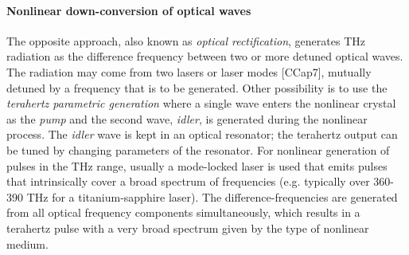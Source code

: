 \paragraph{Nonlinear down-conversion of optical waves}%
The opposite approach, also known as \textit{optical rectification}, generates THz radiation as the difference frequency between two or more detuned optical waves.
The radiation may come from two lasers or laser modes [CCap7], mutually detuned by a frequency that is to be generated. %
Other possibility is to use the \textit{terahertz parametric generation} where a single wave enters the nonlinear crystal as the \textit{pump} and the second wave, \textit{idler}, is generated during the nonlinear process. The \textit{idler} wave is kept in an optical resonator; the terahertz output can be tuned by changing parameters of the resonator. 
For nonlinear generation of pulses in the THz range, usually a mode-locked laser is used that emits pulses that intrinsically cover a broad spectrum of frequencies (e.g. typically over 360-390 THz for a titanium-sapphire laser). The difference-frequencies are generated from all optical frequency components simultaneously, which results in a terahertz pulse with a very broad spectrum given by the type of nonlinear medium. 

